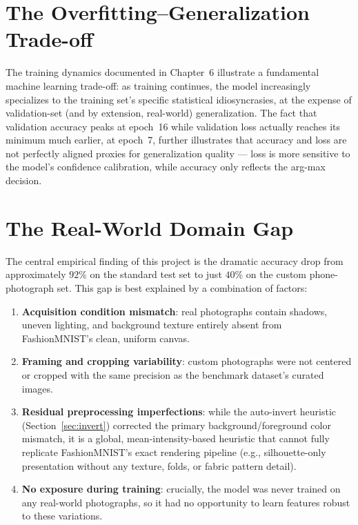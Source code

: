 \documentclass[12pt,a4paper]{report}
\begin{document}
\section{The Overfitting--Generalization Trade-off}
The training dynamics documented in Chapter~6 illustrate a fundamental machine learning trade-off: as training continues, the model increasingly specializes to the training set's specific statistical idiosyncrasies, at the expense of validation-set (and by extension, real-world) generalization. The fact that validation accuracy peaks at epoch~16 while validation loss actually reaches its minimum much earlier, at epoch~7, further illustrates that accuracy and loss are not perfectly aligned proxies for generalization quality — loss is more sensitive to the model's confidence calibration, while accuracy only reflects the arg-max decision.

\section{The Real-World Domain Gap}
The central empirical finding of this project is the dramatic accuracy drop from approximately $92\%$ on the standard test set to just $40\%$ on the custom phone-photograph set. This gap is best explained by a combination of factors:

\begin{enumerate}
    \item \textbf{Acquisition condition mismatch}: real photographs contain shadows, uneven lighting, and background texture entirely absent from FashionMNIST's clean, uniform canvas.
    \item \textbf{Framing and cropping variability}: custom photographs were not centered or cropped with the same precision as the benchmark dataset's curated images.
    \item \textbf{Residual preprocessing imperfections}: while the auto-invert heuristic (Section~\ref{sec:invert}) corrected the primary background/foreground color mismatch, it is a global, mean-intensity-based heuristic that cannot fully replicate FashionMNIST's exact rendering pipeline (e.g., silhouette-only presentation without any texture, folds, or fabric pattern detail).
    \item \textbf{No exposure during training}: crucially, the model was never trained on any real-world photographs, so it had no opportunity to learn features robust to these variations.
\end{enumerate}
\end{document}
